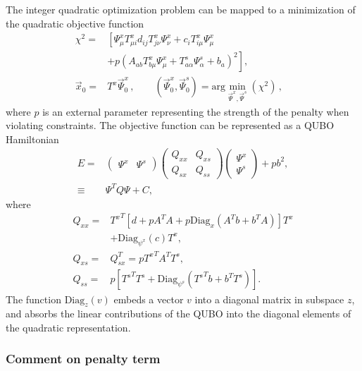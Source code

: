 \documentclass[prd,twocolumn,tightenlines,preprintnumbers,showpacs,superscriptaddress,notitlepage,nofootinbib,eqsecnum,floatfix,longbibliography]{revtex4}
\begin{document}
The integer quadratic optimization problem can be mapped to a minimization of the quadratic objective function
\begin{align}
    \chi^2 = & \left[\Psi^x_{\mu} T^x_{\mu i}d_{ij} T^x_{j \nu}\Psi^x_\nu + c_i T^x_{i\mu} \Psi^x_\mu \right.
    \nonumber\\ \label{eq:qubo-min}
    &\left.+ p (A_{a b} T^x_{b \mu} \Psi^x_{\mu} + T^s_{a \alpha} \Psi^s_\alpha + b_a)^2 \right],\\
    \vec x_0 =&  T^x \vec \Psi^x_0 \, ,
    \qquad (\vec \Psi^x_0, \vec \Psi^s_0) = \mathrm{arg}\min\limits_{\vec{\Psi}^x, \vec \Psi^s}(\chi^2) \,, &
\end{align}
where $p$ is an external parameter representing the strength of the penalty when violating constraints.
The objective function can be represented as a QUBO Hamiltonian
\begin{align}
    E = &
    \begin{pmatrix}
    \Psi^x & \Psi^s
    \end{pmatrix}
    \begin{pmatrix}
    Q_{xx} & Q_{xs}\\
    Q_{sx} & Q_{ss}
    \end{pmatrix}
    \begin{pmatrix}
    \Psi^x\\ \Psi^s
    \end{pmatrix} + pb^2,\\
    \equiv & \Psi^T Q \Psi + C,
    \label{eq:matrix_form}
\end{align}
where
\begin{align}
    Q_{xx} = & {T^{x}}^T \left[ d + p A^T A + p \mathrm{Diag}_{x} \left(A^T b + b^T A\right) \right] T^x \nonumber \\
    &+ \mathrm{Diag}_{\psi^x}(c) T^x,\\
    Q_{xs} = & Q_{sx}^T = p {T^{x}}^T A^T T^s,\\
    Q_{ss} = & p\left[ {T^{s}}^T T^s + \mathrm{Diag}_{\psi^s}\left( {T^{s}}^T b + b^T T^s\right) \right].
\end{align}
The function $\mathrm{Diag}_{z}(v)$ embeds a vector $v$ into a diagonal matrix in subspace $z$, and absorbs the linear contributions of the QUBO into the diagonal elements of the quadratic representation.


\subsubsection{Comment on penalty term}
\label{sec:methods:ilp-qubo-comments}
\end{document}
